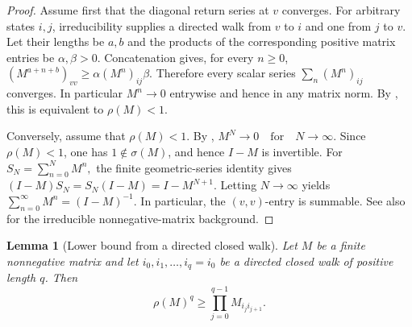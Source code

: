 \documentclass[11pt]{article}
\newtheorem{lemma}[lemma]{Lemma}
\theoremstyle{definition}
\begin{document}
\begin{proof}
Assume first that the diagonal return series at $v$ converges.  For arbitrary states $i,j$,
irreducibility supplies a directed walk from $v$ to $i$ and one from $j$ to $v$.  Let their
lengths be $a,b$ and the products of the corresponding positive matrix entries be
$\alpha,\beta>0$.  Concatenation gives, for every $n\ge0$,
$
 (M^{a+n+b})_{vv}\ge \alpha(M^n)_{ij}\beta.
$
Therefore every scalar series $\sum_n(M^n)_{ij}$ converges.  In particular $M^n\to0$
entrywise and hence in any matrix norm.  By
\cite[Theorem~5.6.12]{HornJohnson2013}, this is equivalent to $\rho(M)<1$.

Conversely, assume that \(\rho(M)<1\).  By
\cite[Theorem~5.6.12]{HornJohnson2013},
$
  M^N\longrightarrow 0
  \quad\mbox{for}\quad N\to\infty.
$
Since \(\rho(M)<1\), one has \(1\notin\sigma(M)\), and hence
\(I-M\) is invertible.  For
$
  S_N=\sum_{n=0}^{N}M^n,
$
the finite geometric-series identity gives
$
  (I-M)S_N=S_N(I-M)=I-M^{N+1}.
$
Letting \(N\to\infty\) yields
$
  \sum_{n=0}^{\infty}M^n=(I-M)^{-1}.
$
In particular, the \((v,v)\)-entry is summable. See also
\cite[Chapter~1]{Seneta2006} for the irreducible nonnegative-matrix background.
\end{proof}

\begin{lemma}[Lower bound from a directed closed walk]
\label{lem:closed-walk}
Let $M$ be a finite nonnegative matrix and let
$i_0,i_1,\ldots,i_q=i_0$ be a directed closed walk of positive length $q$.  Then
\begin{equation}\label{eq:closed-walk}
 \rho(M)^q\ge\prod_{j=0}^{q-1}M_{i_ji_{j+1}}.
\end{equation}
\end{lemma}
\end{document}

